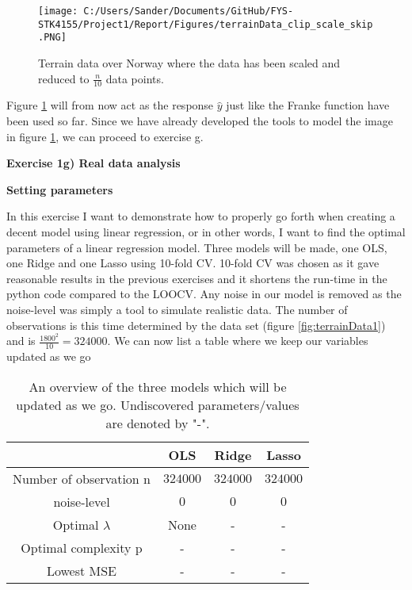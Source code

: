 \documentclass[12pt,a4paper]{article}
\begin{document}
\begin{figure}[H]
\centering
\texttt{[image: C:/Users/Sander/Documents/GitHub/FYS-STK4155/Project1/Report/Figures/terrainData\_clip\_scale\_skip.PNG]}
\caption{\label{fig:terrainData2} Terrain data over Norway where the data has been scaled and reduced to $\frac{n}{10}$ data points.}
\end{figure}

\noindent Figure \ref{fig:terrainData2} will from now act as the response $\hat{y}$ just like the Franke function have been used so far. Since we have already developed the tools to model the image in figure \ref{fig:terrainData2}, we can proceed to exercise g.

\newpage

\begin{center}
\Large{\textbf{Exercise 1g) Real data analysis}}
\end{center}

\begin{center}
\large{\textbf{Setting parameters}}
\end{center}

\noindent In this exercise I want to demonstrate how to properly go forth when creating a decent model using linear regression, or in other words, I want to find the optimal parameters of a linear regression model. Three models will be made, one OLS, one Ridge and one Lasso using 10-fold CV. 10-fold CV was chosen as it gave reasonable results in the previous exercises and it shortens the run-time in the python code compared to the LOOCV. Any noise in our model is removed as the noise-level was simply a tool to simulate realistic data. The number of observations is this time determined by the data set (figure \ref{fig:terrainData1}) and is $\frac{1800^2}{10} = 324000$. We can now list a table where we keep our variables updated as we go

\begin{table}[h]
\caption{\label{tab:update1} An overview of the three models which will be updated as we go. Undiscovered parameters/values are denoted by "-".}
\centering
\begin{tabular}{c|c|c|c}
 & OLS & Ridge & Lasso\\
\hline
Number of observation n & $324000$ & $324000$ & $324000$\\
\hline
noise-level & $0$ & $0$ & $0$\\
\hline
Optimal $\lambda$ & None & - & -\\
\hline
Optimal complexity p & - & - & -\\
\hline
Lowest MSE & - & - & -\\
\end{tabular}
\end{table}
\end{document}
